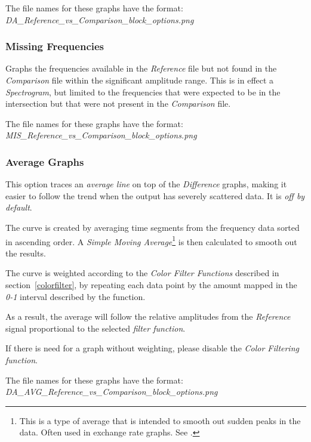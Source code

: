 \documentclass[10pt,a4paper]{report}
\begin{document}
\begin{appendices}
The file names for these graphs have the format:\\ \textit{DA\_Reference\_vs\_Comparison\_block\_options.png}

\subsubsection{Missing Frequencies} 

Graphs the frequencies available in the \textit{Reference} file but not found in the \textit{Comparison} file within the significant amplitude range. This is in effect a \textit{Spectrogram}, but limited to the frequencies that were expected to be in the intersection but that were not present in the \textit{Comparison} file.

The file names for these graphs have the format:\\ \textit{MIS\_Reference\_vs\_Comparison\_block\_options.png}

\subsubsection{Average Graphs}
\label{averaged}

This option traces an \textit{average line} on top of the \textit{Difference} graphs, making it easier to follow the trend when the output has severely scattered data. It is \textit{off by default}.

The curve is created by averaging time segments from the frequency data sorted in ascending order. A \textit{Simple Moving Average}\footnote{This is a type of average that is intended to smooth out sudden peaks in the data. Often used in exchange rate graphs. See \cite{sma}.} is then calculated to smooth out the results.

The curve is weighted according to the \textit{Color Filter Functions} described in section~\ref{colorfilter}, by repeating each data point by the amount mapped in the \textit{0-1} interval described by the function.

As a result, the average will follow the relative amplitudes from the \textit{Reference} signal proportional to the selected \textit{filter function}.

If there is need for a graph without weighting, please disable the \textit{Color Filtering function}.

The file names for these graphs have the format:\\ \textit{DA\_AVG\_Reference\_vs\_Comparison\_block\_options.png}


\end{appendices}
\end{document}
